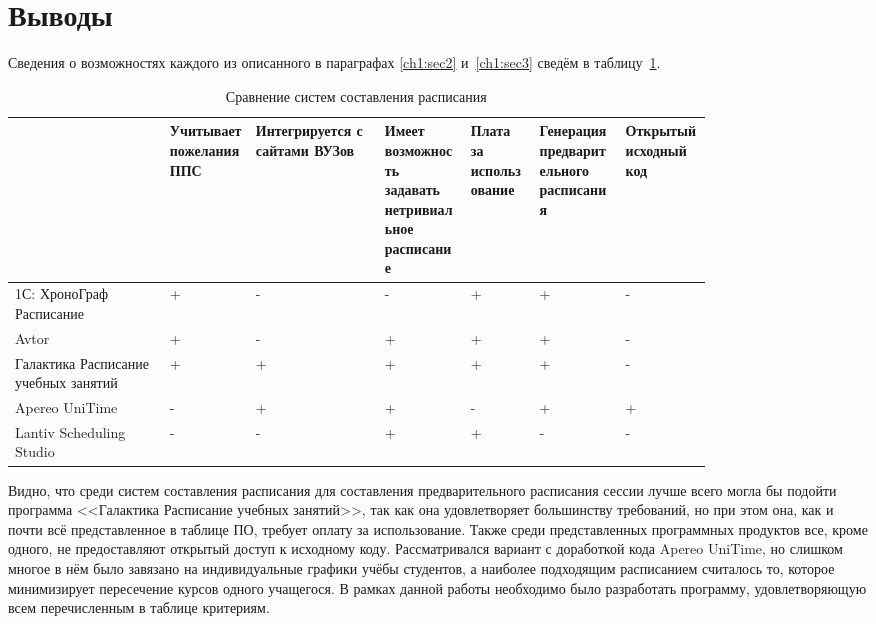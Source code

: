 \section{Выводы} \label{ch1:conclusion}
Сведения о возможностях каждого из описанного в параграфах	\ref{ch1:sec2} и~\ref{ch1:sec3} сведём в таблицу~\ref{tab:1.4.1}.
\begin{table} [htbp]
	\centering\small
	\caption{Сравнение систем составления расписания}%
	\label{tab:1.4.1}	
	\begin{tabular}{|p{0.18\linewidth}|p{0.1\linewidth}|p{0.15\linewidth}|p{0.1\linewidth}|p{0.08\linewidth}|p{0.1\linewidth}|p{0.1\linewidth}|}
		\hline
		&Учитывает пожелания ППС&Интегрируется с сайтами ВУЗов&Имеет возможность задавать нетривиальное расписание&Плата за использование&Генерация предварительного расписания&Открытый исходный код\\
		\hline
		1С: ХроноГраф Расписание&+&-&-&+&+&-\\ \hline
		Avtor&+&-&+&+&+&-\\ \hline
		Галактика Расписание учебных занятий&+&+&+&+&+&-\\ \hline
		Apereo UniTime&-&+&+&-&+&+\\ \hline
		Lantiv Scheduling Studio&-&-&+&+&-&-\\ \hline	
	\end{tabular}
\end{table}

Видно, что среди систем составления расписания для составления предварительного расписания сессии лучше всего могла бы подойти программа <<Галактика Расписание учебных занятий>>, так как она удовлетворяет большинству требований, но при этом она, как и почти всё представленное в таблице ПО, требует оплату за использование. Также среди представленных программных продуктов все, кроме одного, не предоставляют открытый доступ к исходному коду. Рассматривался вариант с доработкой кода Apereo UniTime, но слишком многое в нём было завязано на индивидуальные графики учёбы студентов, а наиболее подходящим расписанием считалось то, которое минимизирует пересечение курсов одного учащегося.
В рамках данной работы необходимо было разработать программу, удовлетворяющую всем перечисленным в таблице критериям.